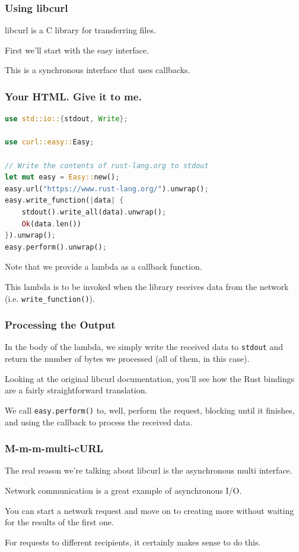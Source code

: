 \begin{frame}
\frametitle{Using libcurl}

libcurl is a C library for transferring files. 

First we'll start with the easy interface. 

This is a synchronous interface
that uses callbacks. 

\end{frame}


\begin{frame}[fragile]
\frametitle{Your HTML. Give it to me.}

\begin{lstlisting}[language=Rust]
use std::io::{stdout, Write};

use curl::easy::Easy;

// Write the contents of rust-lang.org to stdout
let mut easy = Easy::new();
easy.url("https://www.rust-lang.org/").unwrap();
easy.write_function(|data| {
    stdout().write_all(data).unwrap();
    Ok(data.len())
}).unwrap();
easy.perform().unwrap();
\end{lstlisting}

Note that we provide a lambda as a callback function. 

This lambda is to be invoked
when the library receives data from the network (i.e. \texttt{write\_function()}).

\end{frame}


\begin{frame}
\frametitle{Processing the Output}

In the body of the lambda, we simply write the received data to \texttt{stdout}
and return the number of bytes we processed (all of them, in this case).


Looking at the original libcurl documentation, you'll see how the Rust bindings are a fairly straightforward translation.

We call \texttt{easy.perform()} to, well, perform the request, blocking until it finishes, and using the callback to process the received data.


\end{frame}


\begin{frame}
\frametitle{M-m-m-multi-cURL}
The real reason we're talking about libcurl is the asynchronous multi interface.

Network communication is a great example of asynchronous I/O.


You can start a network request and move on to creating more without waiting for the results of the first one. 

For requests to different recipients, it certainly makes sense to do this.

\end{frame}



